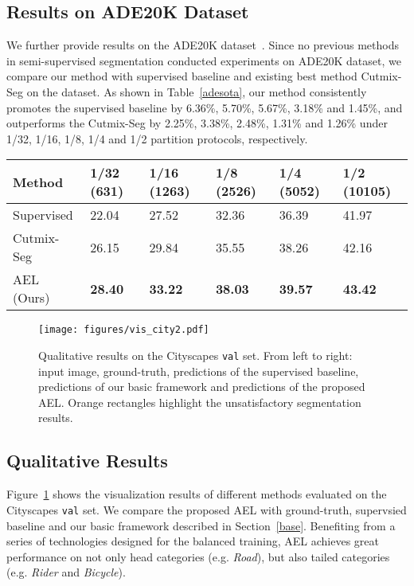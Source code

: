\subsection{Results on ADE20K Dataset}
We further provide results on the ADE20K dataset~\cite{zhouade}. Since no previous methods in semi-supervised segmentation conducted experiments on ADE20K dataset, we compare our method with supervised baseline and existing best method Cutmix-Seg on the dataset. As shown in Table~\ref{adesota}, our method consistently promotes the supervised baseline by 6.36\%, 5.70\%, 5.67\%, 3.18\% and 1.45\%, and outperforms the Cutmix-Seg by 2.25\%, 3.38\%, 2.48\%, 1.31\% and 1.26\% under 1/32, 1/16, 1/8, 1/4 and 1/2 partition protocols, respectively.

\begin{table*}[t]
\renewcommand\arraystretch{1.1}
\begin{center}
\caption{Comparison with supervised baseline and Cutmix-Seg on the \textbf{ADE20K} \texttt{val} set under different partition protocols. All the methods are based on DeepLabv3+ with ResNet-101 backbone.}
\label{adesota}
\begin{tabularx}{14cm}{p{2.5cm}|X<{\centering}| X<{\centering}| X<{\centering} | X<{\centering}| X<{\centering}}
\toprule
Method  & 1/32 (631) & 1/16 (1263) & 1/8 (2526) & 1/4 (5052) & 1/2 (10105) \\
\midrule
Supervised  & 22.04 & 27.52 & 32.36 & 36.39 & 41.97 \\
\midrule
Cutmix-Seg~\cite{FrenchLAMF20}  & 26.15 & 29.84 & 35.55 & 38.26 & 42.16 \\
\midrule
AEL (Ours)    & \textbf{28.40} & \textbf{33.22} & \textbf{38.03} & \textbf{39.57}  & \textbf{43.42}\\
\bottomrule
\end{tabularx}
\end{center}
\end{table*}
\begin{figure}[!h]
    \centering
    \texttt{[image: figures/vis\_city2.pdf]}
    \caption{Qualitative results on the Cityscapes \texttt{val} set. From left to right: input image, ground-truth, predictions of the supervised baseline, predictions of our basic framework and predictions of the proposed AEL. Orange rectangles highlight the unsatisfactory segmentation results.}
    \label{vis_city}
\end{figure}
\subsection{Qualitative Results}
Figure~\ref{vis_city} shows the visualization results of different methods evaluated on the Cityscapes \texttt{val} set. We compare the proposed AEL with ground-truth, supervsied baseline and our basic framework described in Section~\ref{base}. Benefiting from a series of technologies designed for the balanced training, AEL achieves great performance on not only head categories (e.g. \textit{Road}), but also tailed categories (e.g. \textit{Rider} and \textit{Bicycle}).

